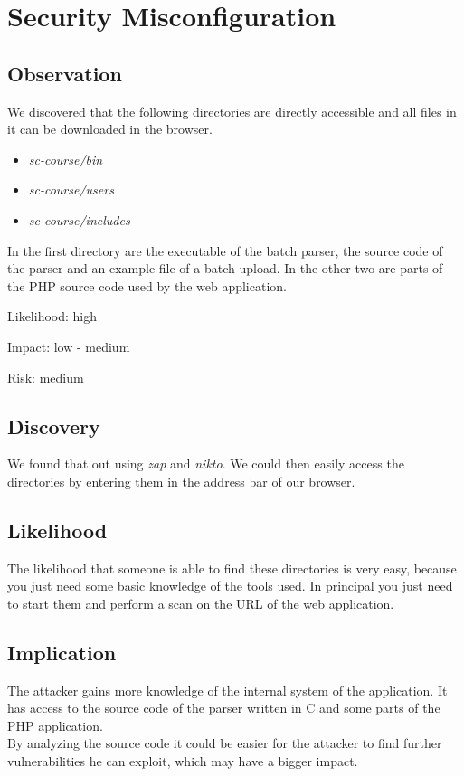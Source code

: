 \chapter{Security Misconfiguration}

\section{Observation}

We discovered that the following directories are directly accessible and all files in it can be downloaded in the browser.

\begin{itemize}
\item \textit{sc-course/bin}
\item \textit{sc-course/users}
\item \textit{sc-course/includes}
\end{itemize}

In the first directory are the executable of the batch parser, the source code of the parser and an example file of a batch upload. In the other two are parts of the PHP source code used by the web application.\newline


Likelihood: high \newline

Impact: low - medium\newline

Risk: medium\newline

\section{Discovery}

We found that out using \textit{zap} and \textit{nikto}. We could then easily access the directories by entering them in the address bar of our browser.

\section{Likelihood}
The likelihood that someone is able to find these directories is very easy, because you just need some basic knowledge of the tools used. In principal you just need to start them and perform a scan on the URL of the web application.

\section{Implication}
The attacker gains more knowledge of the internal system of the application. It has access to the source code of the parser written in C and some parts of the PHP application. \\
By analyzing the source code it could be easier for the attacker to find further vulnerabilities he can exploit, which may have a bigger impact.

